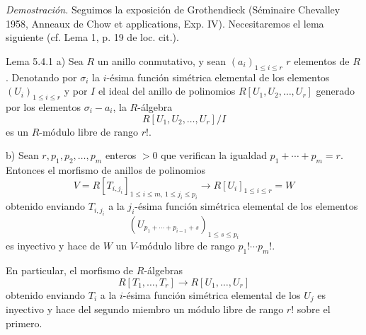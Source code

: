 \emph{Demostración.} Seguimos la exposición de Grothendieck (Séminaire Chevalley 1958, Anneaux de Chow et applications, Exp. IV). Necesitaremos el lema siguiente (cf. Lema 1, p. 19 de loc. cit.).

\begin{statement}{Lema 5.4.1}
a) Sea $R$ un anillo conmutativo, y sean $(a_i)_{1\le i\le r}$ $r$ elementos de $R$. Denotando por $\sigma_i$ la $i$-ésima función simétrica elemental de los elementos $(U_i)_{1\le i\le r}$ y por $I$ el ideal del anillo de polinomios $R[U_1,U_2,\ldots,U_r]$ generado por los elementos $\sigma_i-a_i$, la $R$-álgebra
\[
R[U_1,U_2,\ldots,U_r]/I
\]
es un $R$-módulo libre de rango $r!$.

b) Sean $r,p_1,p_2,\ldots,p_m$ enteros $>0$ que verifican la igualdad $p_1+\cdots+p_m=r$. Entonces el morfismo de anillos de polinomios
\[
V=R[T_{i,j_i}]_{1\le i\le m,\,1\le j_i\le p_i}
\longrightarrow R[U_i]_{1\le i\le r}=W
\]
obtenido enviando $T_{i,j_i}$ a la $j_i$-ésima función simétrica elemental de los elementos
\[
(U_{p_1+\cdots+p_{i-1}+s})_{1\le s\le p_i}
\]
es inyectivo y hace de $W$ un $V$-módulo libre de rango $p_1!\cdots p_m!$.

En particular, el morfismo de $R$-álgebras
\[
R[T_1,\ldots,T_r]\to R[U_1,\ldots,U_r]
\]
obtenido enviando $T_i$ a la $i$-ésima función simétrica elemental de los $U_j$ es inyectivo y hace del segundo miembro un módulo libre de rango $r!$ sobre el primero.
\end{statement}
